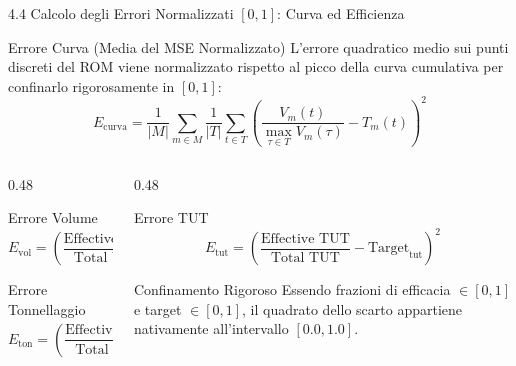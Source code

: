 \documentclass[aspectratio=169, 10pt]{beamer}
\begin{document}
\begin{frame}{4.4 Calcolo degli Errori Normalizzati $[0, 1]$: Curva ed Efficienza}
    \begin{block}{Errore Curva (Media del MSE Normalizzato)}
        \footnotesize
        L'errore quadratico medio sui punti discreti del ROM viene normalizzato rispetto al picco della curva cumulativa per confinarlo rigorosamente in $[0, 1]$:
        $$E_{\mathrm{curva}} = \frac{1}{|M|} \sum_{m \in M} \frac{1}{|T|} \sum_{t \in T} \left( \frac{V_m(t)}{\max_{\tau \in T} V_m(\tau)} - T_m(t) \right)^2$$
    \end{block}
    \vspace{-0.1cm}
    \begin{columns}[T]
        \begin{column}{0.48\textwidth}
            \begin{exampleblock}{Errore Volume}
                \footnotesize
                $$E_{\mathrm{vol}} = \left( \frac{\text{Effective Volume}}{\text{Total Volume}} - \mathrm{Target}_{\mathrm{vol}} \right)^2$$
            \end{exampleblock}
            \begin{exampleblock}{Errore Tonnellaggio}
                \footnotesize
                $$E_{\mathrm{ton}} = \left( \frac{\text{Effective Tonnage}}{\text{Total Tonnage}} - \mathrm{Target}_{\mathrm{ton}} \right)^2$$
            \end{exampleblock}
        \end{column}
        \begin{column}{0.48\textwidth}
            \begin{exampleblock}{Errore TUT}
                \footnotesize
                $$E_{\mathrm{tut}} = \left( \frac{\text{Effective TUT}}{\text{Total TUT}} - \mathrm{Target}_{\mathrm{tut}} \right)^2$$
            \end{exampleblock}
            \begin{block}{Confinamento Rigoroso}
                \footnotesize
                Essendo frazioni di efficacia $\in [0, 1]$ e target $\in [0, 1]$, il quadrato dello scarto appartiene nativamente all'intervallo $[0.0, 1.0]$.
            \end{block}
        \end{column}
    \end{columns}
\end{frame}
\end{document}
